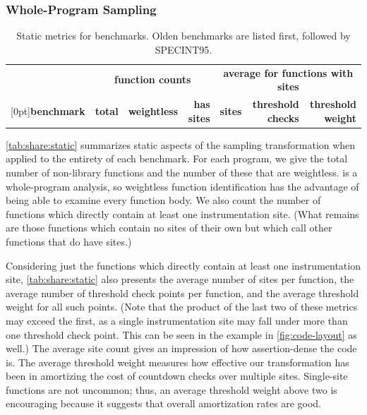\subsubsection{Whole-Program Sampling}
\label{sec:share:whole}

\begin{table}[tb]
  \centering
  \small
  \begin{tabular}{|l|rrr|rrr|}
    \hline
    & \multicolumn{3}{c|}{\textbf{function counts}} & \multicolumn{3}{c|}{\textbf{average for functions with sites}} \\
    \raisebox{1.5ex}[0pt]{\textbf{benchmark}} & \textbf{total} & \textbf{weightless} & \textbf{has sites} & \textbf{sites} & \textbf{threshold checks} & \textbf{threshold weight} \\
    \hline\hline
    
  \end{tabular}
  \caption{Static metrics for \CCured benchmarks.  Olden benchmarks
    are listed first, followed by SPECINT95.}
  \label{tab:share:static}
\end{table}

\autoref{tab:share:static} summarizes static aspects of the sampling
transformation when applied to the entirety of each benchmark.  For
each program, we give the total number of non-library functions and
the number of these that are weightless.  \CCured is a whole-program
analysis, so weightless function identification has the advantage of
being able to examine every function body.  We also count the number
of functions which directly contain at least one instrumentation site.
(What remains are those functions which contain no sites of their own
but which call other functions that do have sites.)

Considering just the functions which directly contain at least one
instrumentation site, \autoref{tab:share:static} also presents the
average number of sites per function, the average number of threshold
check points per function, and the average threshold weight for all
such points.  (Note that the product of the last two of these metrics
may exceed the first, as a single instrumentation site may fall under
more than one threshold check point.  This can be seen in the example
in \autoref{fig:code-layout} as well.)  The average site count gives
an impression of how assertion-dense the code is.  The average
threshold weight measures how effective our transformation has been in
amortizing the cost of countdown checks over multiple sites.
Single-site functions are not uncommon; thus, an average threshold
weight above two is encouraging because it suggests that overall
amortization rates are good.

